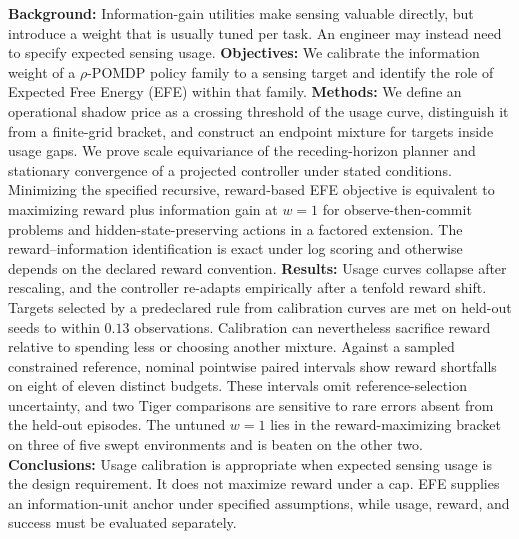 \textbf{Background:} Information-gain utilities make sensing valuable directly, but introduce a weight that is usually tuned per task. An engineer may instead need to specify expected sensing usage.
\textbf{Objectives:} We calibrate the information weight of a $\rho$-POMDP policy family to a sensing target and identify the role of Expected Free Energy (EFE) within that family.
\textbf{Methods:} We define an operational shadow price as a crossing threshold of the usage curve, distinguish it from a finite-grid bracket, and construct an endpoint mixture for targets inside usage gaps. We prove scale equivariance of the receding-horizon planner and stationary convergence of a projected controller under stated conditions. Minimizing the specified recursive, reward-based EFE objective is equivalent to maximizing reward plus information gain at $w=1$ for observe-then-commit problems and hidden-state-preserving actions in a factored extension. The reward--information identification is exact under log scoring and otherwise depends on the declared reward convention.
\textbf{Results:} Usage curves collapse after rescaling, and the controller re-adapts empirically after a tenfold reward shift. Targets selected by a predeclared rule from calibration curves are met on held-out seeds to within $0.13$ observations. Calibration can nevertheless sacrifice reward relative to spending less or choosing another mixture. Against a sampled constrained reference, nominal pointwise paired intervals show reward shortfalls on eight of eleven distinct budgets. These intervals omit reference-selection uncertainty, and two Tiger comparisons are sensitive to rare errors absent from the held-out episodes. The untuned $w=1$ lies in the reward-maximizing bracket on three of five swept environments and is beaten on the other two.
\textbf{Conclusions:} Usage calibration is appropriate when expected sensing usage is the design requirement. It does not maximize reward under a cap. EFE supplies an information-unit anchor under specified assumptions, while usage, reward, and success must be evaluated separately.
